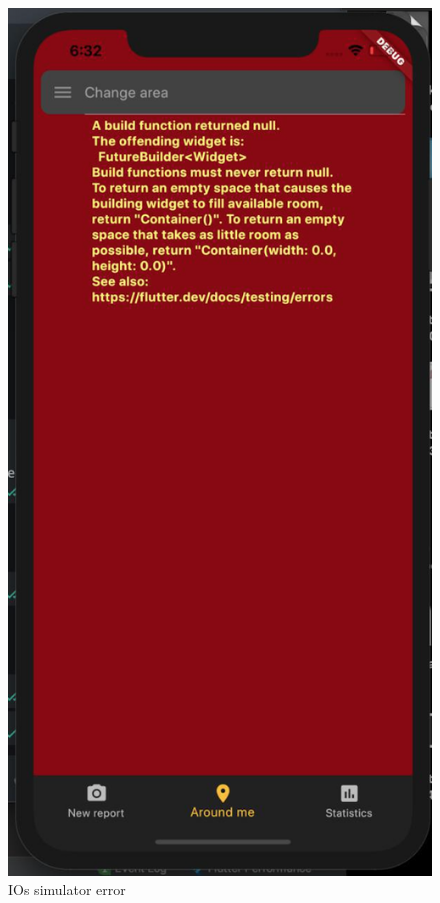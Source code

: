 \documentclass[../ATD.tex]{subfiles}
\begin{document}
    \begin{figure}[H]
        \centering
        \includegraphics[scale = 0.7]{assets/iOS_simulator_error.png}
        \caption[IOs simulator error, \textit{Error}]{IOs simulator error}
    \end{figure}
\end{document}
